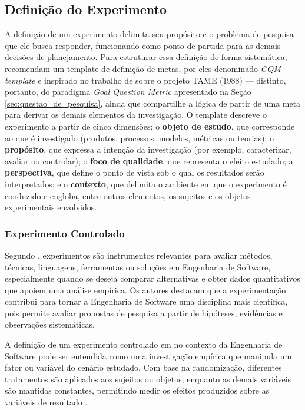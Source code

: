 \subsection{Definição do Experimento}

A definição de um experimento delimita seu propósito e o problema de pesquisa que ele busca responder, funcionando como ponto de partida para as demais decisões de planejamento. Para estruturar essa definição de forma sistemática,  recomendam um template de definição de metas, por eles denominado \textit{GQM template} e inspirado no trabalho de  sobre o projeto TAME (1988) --- distinto, portanto, do paradigma \textit{Goal Question Metric} apresentado na Seção \ref{sec:questao_de_pesquisa}, ainda que compartilhe a lógica de partir de uma meta para derivar os demais elementos da investigação. O template descreve o experimento a partir de cinco dimensões: o \textbf{objeto de estudo}, que corresponde ao que é investigado (produtos, processos, modelos, métricas ou teorias); o \textbf{propósito}, que expressa a intenção da investigação (por exemplo, caracterizar, avaliar ou controlar); o \textbf{foco de qualidade}, que representa o efeito estudado; a \textbf{perspectiva}, que define o ponto de vista sob o qual os resultados serão interpretados; e o \textbf{contexto}, que delimita o ambiente em que o experimento é conduzido e engloba, entre outros elementos, os sujeitos e os objetos experimentais envolvidos.

\subsubsection{Experimento Controlado}
\label{sec:experimento_controlado}

Segundo , experimentos são instrumentos relevantes para avaliar métodos, técnicas, linguagens, ferramentas ou soluções em Engenharia de Software, especialmente quando se deseja comparar alternativas e obter dados quantitativos que apoiem uma análise empírica. Os autores destacam que a experimentação contribui para tornar a Engenharia de Software uma disciplina mais científica, pois permite avaliar propostas de pesquisa a partir de hipóteses, evidências e observações sistemáticas.

A definição de um experimento controlado em no contexto da Engenharia de Software pode ser entendida como uma investigação empírica que manipula um fator ou variável do cenário estudado. Com base na randomização, diferentes tratamentos são aplicados aos sujeitos ou objetos, enquanto as demais variáveis são mantidas constantes, permitindo medir os efeitos produzidos sobre as variáveis de resultado \cite{wohlin2024}.

